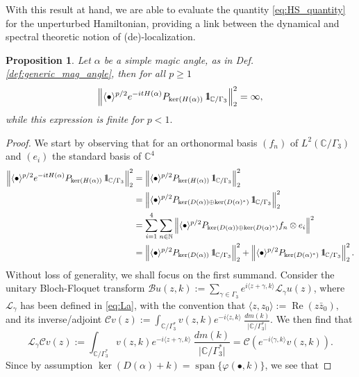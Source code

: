 \documentclass[reqno,12pt,letterpaper]{amsart}
\newcommand{\CC}{{\mathbb C}}
\newtheorem{prop}[theo]{Proposition}
\numberwithin{equation}{section}
\DeclareMathOperator{\Real}{Re}
\let\Re=\Real
\def\indic{\operatorname{1\hskip-2.75pt\relax l}}
\begin{document}
With this result at hand, we are able to evaluate the quantity \eqref{eq:HS_quantity} for the unperturbed Hamiltonian, providing a link between the dynamical and spectral theoretic notion of (de)-localization.
\begin{prop}
\label{prop:wannier}
Let $\alpha$ be a simple magic angle, as in Def. \ref{def:generic_mag_angle}, then for all $p \ge 1$
\[ \left\lVert \langle \bullet \rangle^{p/2} e^{-itH(\alpha)}P_{\ker(H(\alpha))}\indic_{\CC/\Gamma_3} \right\rVert_2^2 = \infty, \]
while this expression is finite for $p<1.$ 
\end{prop}
\begin{proof}
 We start by observing that for an orthonormal basis $(f_n)$ of $L^2(\CC/\Gamma_3)$ and $(e_i)$ the standard basis of $\CC^4$
 \[\begin{split}
 \left\lVert \langle \bullet \rangle^{p/2} e^{-itH(\alpha)}P_{\ker(H(\alpha))}\indic_{\CC/\Gamma_3} \right\rVert_2^2 
 &= \left\lVert \langle \bullet \rangle^{p/2} P_{\ker(H(\alpha))}\indic_{\CC/\Gamma_3} \right\rVert_2^2\\
 &= \left\lVert \langle \bullet \rangle^{p/2} P_{\ker(D(\alpha)) \oplus \ker(D(\alpha)^*)}\indic_{\CC/\Gamma_3} \right\rVert_2^2\\
  &= \sum_{i=1}^4 \sum_{n \in \mathbb N}\left\lVert \langle \bullet \rangle^{p/2} P_{\ker(D(\alpha)) \oplus \ker(D(\alpha)^*)} f_n \otimes e_i \right\rVert^2\\
    &= \left\lVert \langle \bullet \rangle^{p/2} P_{\ker(D(\alpha))} \indic_{\CC/\Gamma_3} \right\rVert_2^2 + \left\lVert \langle \bullet \rangle^{p/2} P_{\ker(D(\alpha)^*)} \indic_{\CC/\Gamma_3} \right\rVert_2^2.
 \end{split}\]
 Without loss of generality, we shall focus on the first summand. 
Consider the unitary Bloch-Floquet transform $\mathcal Bu(z,k):=\sum_{\gamma \in \Gamma_3} e^{i \langle z+\gamma,k\rangle} \mathscr L_{\gamma}u(z)$, where $\mathscr L_{\gamma}$ has been defined in \eqref{eq:La}, with the convention that $\langle z,z_0\rangle:=\Re(z\bar z_0),$ and its inverse/adjoint $\mathcal C  v(z):=\int_{\CC/\Gamma_3^*} v(z,k) e^{-i\langle z,k\rangle} \ \frac{dm(k)}{\vert \CC/\Gamma_3^* \vert}$. 
We then find that
\begin{equation}
\label{eq:identity2}
 \mathscr L_{\gamma} \mathcal C  v(z):=\int_{\CC/\Gamma_3^*} v(z,k) e^{-i\langle z+\gamma,k\rangle} \ \frac{dm(k)}{\vert \CC/\Gamma_3^* \vert}  = \mathcal C(e^{-i \langle \gamma,k \rangle} v(z,k)).
 \end{equation}
Since by assumption $\ker(D(\alpha)+k) = \operatorname{span}\{\varphi(\bullet,k)\}$, we see that 

\end{proof}
\end{document}
